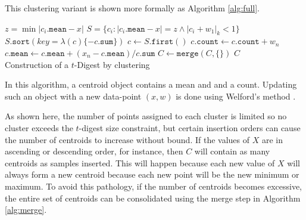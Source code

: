 \documentclass[11pt]{amsart}
\begin{document}
This clustering variant is shown more formally as Algorithm \ref{alg:full}.
 \begin{algorithm}[htb]
 \label{alg:full}
\SetNoFillComment
{}
 {
  $z = \min | c_i.\mathtt{mean} - x |$\;
  $S = \lbrace c_i  :  |c_i.\mathtt{mean} - x| = z \wedge |c_i+w_1|_k < 1 \rbrace $\;
   {
       $S.\mathtt{sort}( key=\lambda (c) \lbrace -c.\mathtt{sum} \rbrace)$\;
       $c \gets S.\mathtt{first()}$ \;
       $c.\mathtt{count} \gets c.\mathtt{count} + w_n$\;
       $c.\mathtt{mean} \gets c.\mathtt{mean} + (x_n- c.\mathtt{mean})/ c.\mathtt{sum}$\;
     } 
       {
         $C \gets \mathtt{merge}( C, \lbrace\rbrace ) $\;
       }
} 
\Return $ C $\\
\caption{Construction of a $t$-Digest by clustering}
\end{algorithm}

In this algorithm, a centroid object contains a mean and and a count.  Updating such an object with a new data-point $(x,w)$ is done using Welford's method \cite{wiki:welford, knuth2welford, welford62}.

As shown here, the number of points assigned to each cluster is limited so no cluster exceeds the $t$-digest size constraint, but certain insertion orders can cause the number of centroids to increase without bound. If the values of $X$ are in ascending or descending order, for instance, then $C$ will contain as many centroids as samples inserted.  This will happen because each new value of $X$ will always form a new centroid because each new point will be the new minimum or maximum.  To avoid this pathology, if the number of centroids becomes excessive, the entire set of centroids can be consolidated using the merge step in Algorithm \ref{alg:merge}.  
\end{document}
